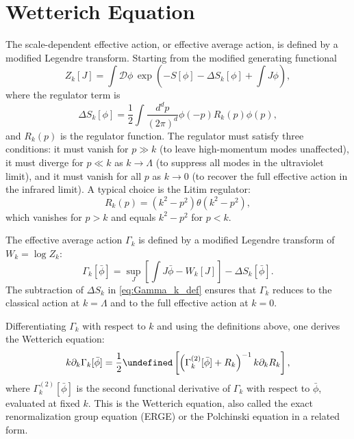 \documentclass[11pt, twoside, openright]{book}
\theoremstyle{dotted}
\theoremstyle{definition}
\newcommand{\Gk}{\Gamma_k}             %
\newcommand{\Gktwo}{\Gamma_k^{(2)}}   %
\newcommand{\Rk}{R_k}                  %
\newcommand{\kdk}{k\partial_k}         %
\let\tr\undefined
\DeclareMathOperator{\tr}{Tr}          %
\begin{document}
\section{Wetterich Equation}

The scale-dependent effective action, or effective average action, is defined by
a modified Legendre transform. Starting from the modified generating functional
\begin{equation}
  Z_k[J] = \int \mathcal{D}\phi \, \exp\!\left(-S[\phi] - \Delta S_k[\phi] + \int J\phi\right),
  \label{eq:modified_Z}
\end{equation}
where the regulator term is
\begin{equation}
  \Delta S_k[\phi] = \frac{1}{2}\int \frac{d^dp}{(2\pi)^d}
  \phi(-p) R_k(p) \phi(p),
  \label{eq:regulator_term}
\end{equation}
and $R_k(p)$ is the regulator function. The regulator must satisfy three conditions:
it must vanish for $p \gg k$ (to leave high-momentum modes unaffected), it must
diverge for $p \ll k$ as $k \to \Lambda$ (to suppress all modes in the ultraviolet
limit), and it must vanish for all $p$ as $k \to 0$ (to recover the full effective
action in the infrared limit). A typical choice is the Litim regulator:
\begin{equation}
  R_k(p) = (k^2 - p^2)\theta(k^2 - p^2),
  \label{eq:litim_regulator}
\end{equation}
which vanishes for $p > k$ and equals $k^2 - p^2$ for $p < k$.

The effective average action $\Gk$ is defined by a modified Legendre transform of
$W_k = \log Z_k$:
\begin{equation}
  \Gk[\bar\phi] = \sup_J\left[\int J\bar\phi - W_k[J]\right] - \Delta S_k[\bar\phi].
  \label{eq:Gamma_k_def}
\end{equation}
The subtraction of $\Delta S_k$ in \eqref{eq:Gamma_k_def} ensures that $\Gk$
reduces to the classical action at $k = \Lambda$ and to the full effective action
at $k = 0$.

Differentiating $\Gk$ with respect to $k$ and using the definitions above, one
derives the Wetterich equation:
\begin{equation}
  \kdk \Gk[\bar\phi] = \frac{1}{2}\tr\left[
    \left(\Gktwo[\bar\phi] + \Rk\right)^{-1} \kdk \Rk
  \right],
  \label{eq:wetterich}
\end{equation}
where $\Gktwo[\bar\phi]$ is the second functional derivative of $\Gk$ with respect
to $\bar\phi$, evaluated at fixed $k$. This is the Wetterich equation, also called
the exact renormalization group equation (ERGE) or the Polchinski equation in a
related form.
\end{document}

